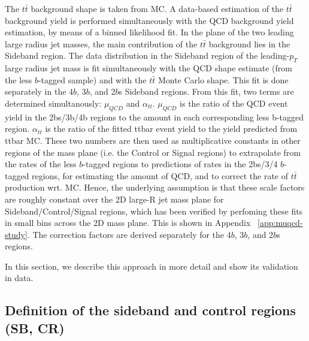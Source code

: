 The $t\bar{t}$ background shape is taken from MC. A data-based estimation of the $t\bar{t}$ background yield is performed simultaneously with the QCD background yield estimation, by means of a binned likelihood fit.
In the plane of the two leading large radius jet masses, the main contribution of the $t\bar{t}$ background lies in the Sideband region. The data distribution in the Sideband region of the leading-$p_{T}$ large radius jet mass is fit simultaneously with the QCD shape estimate (from the less $b$-tagged sample) and with the $t\bar{t}$ Monte Carlo shape. This fit is done separately in the 4$b$, 3$b$, and 2$b$s Sideband regions.
From this fit, two terms are determined simultanously: $\mu_{QCD}$ and $\alpha_{tt}$. $\mu_{QCD}$ is the ratio of the QCD event yield in the 2bs/3b/4b regions to the amount in each corresponding less b-tagged region. $\alpha_{tt}$ is the ratio of the fitted ttbar event yield to the yield predicted from ttbar MC.
These two numbers are then used as multiplicative constants in other regions of the mass plane (i.e. the Control or Signal regions) to extrapolate from the rates of the less $b$-tagged regions to predictions of rates in the 2bs/3/4 $b$-tagged regions, for estimating the amount of QCD, and to correct the rate of $t\bar{t}$ production wrt. MC. Hence, the underlying assumption is that these scale factors are roughly constant over the 2D large-R jet mass plane for Sideband/Control/Signal regions, which has been verified by perfoming these fits in small bins across the 2D mass plane. This is shown in Appendix ~\ref{app:muqcd-study}. The correction factors are derived separately for the 4$b$, 3$b$, and 2$b$s regions.

In this section, we describe this approach in more detail and show its validation in data.


\subsection{Definition of the sideband and control regions (SB, CR)}
\label{sec:boosted-SBCR}


